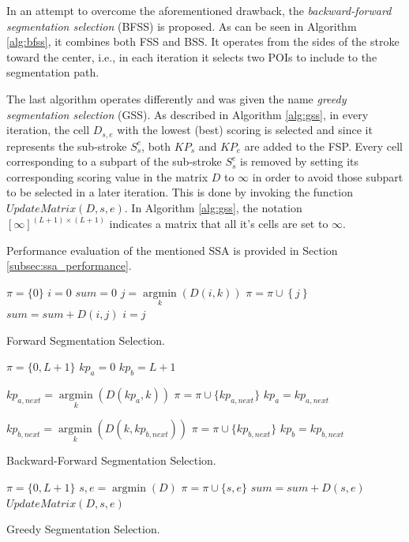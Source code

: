 \documentclass[10pt, conference, compsocconf]{IEEEtran}
\begin{document}
In an attempt to overcome the aforementioned drawback, the \emph{backward-forward segmentation selection} (BFSS) is proposed.
As can be seen in Algorithm \ref{alg:bfss}, it combines both FSS and BSS.
It operates from the sides of the stroke toward the center, i.e., in each iteration it selects two POIs to include to the segmentation path.

The last algorithm operates differently and was given the name \emph{greedy segmentation selection} (GSS).
As described in Algorithm \ref{alg:gss}, in every iteration, the cell $D_{s,e}$ with the lowest (best) scoring is selected and since it represents the sub-stroke $S_{s}^{e}$, both $KP_{s}$ and $KP_{e}$ are added to the FSP. 
Every cell corresponding to a subpart of the sub-stroke $S_{s}^{e}$ is removed by setting its corresponding scoring value in the matrix $D$ to $\infty$ in order to avoid those subpart to be selected in a later iteration. 
This is done by invoking the function $UpdateMatrix(D,s,e)$. 
In Algorithm \ref{alg:gss}, the notation $[\infty]^{(L+1)\times (L+1)}$ indicates a matrix that all it's cells are set to $\infty$.

Performance evaluation of the mentioned SSA is provided in Section \ref{subsec:ssa_performance}.

\begin{algorithm}
$\pi = \{0\} $\;
$i=0$\;
$sum=0$\;
{
	$j = \mathop {\arg \min }\limits_k \left( {D\left( {i,k} \right)} \right)$\;
	$\pi = \pi \cup \left\{ j \right\}$\;
	$sum = sum + D\left( {i,j} \right)$\;
	$i=j$\;
}
\caption{Forward Segmentation Selection.}
\label{alg:fss}
\end{algorithm}

\begin{algorithm}
$\pi = \{0,L+1\}$\;
$kp_{a}=0$\;
$kp_{b}=L+1$\;
{
	$kp_{a,next} = \mathop {\arg \min}\limits_k (D(kp_a,k))$\;
	$\pi = \pi \cup \{kp_{a,next}\}$\;
	$kp_{a}=kp_{a,next}$\;
	
	$kp_{b,next} = \mathop {\arg \min}\limits_k (D(k,kp_{b,next}))$\;
	$\pi = \pi \cup \{kp_{b,next}\}$\;	
	$kp_{b}=kp_{b,next}$\;
}
\caption{Backward-Forward Segmentation Selection.}
\label{alg:bfss}
\end{algorithm}

\begin{algorithm}
$\pi = \{0,L+1\}$\;
{
	${s,e} = \mathop {\arg \min}(D)$\;
	$\pi = \pi \cup \{s,e\}$\;
	$sum = sum + D(s,e)$\;
	$UpdateMatrix(D,s,e)$\;
}
\caption{Greedy Segmentation Selection.}
\label{alg:gss}
\end{algorithm}
\end{document}
